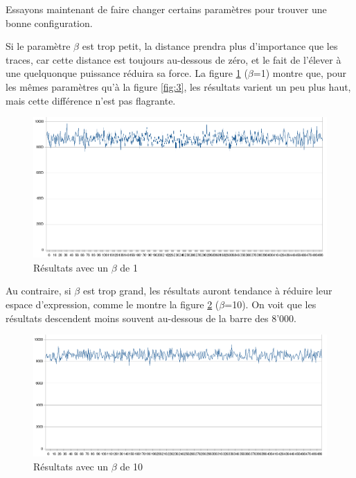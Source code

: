 \documentclass[a4paper, 11pt]{article}
\begin{document}
{	Essayons maintenant de faire changer certains paramètres pour trouver une bonne configuration.

	Si le paramètre $\beta$ est trop petit, la distance prendra plus d'importance que les traces, car cette distance est toujours au-dessous de zéro, et le fait de l'élever à une quelquonque puissance réduira sa force. La figure \ref{fig:5} ($\beta$=1) montre que, pour les mêmes paramètres qu'à la figure \ref{fig:3}, les résultats varient un peu plus haut, mais cette différence n'est pas flagrante.

\begin{figure}[H]
   \begin{center}
      \includegraphics[width=14cm]{../images/5.png}
   \end{center}
   \caption{Résultats avec un $\beta$ de 1}
	\label{fig:5}
\end{figure}

	Au contraire, si $\beta$ est trop grand, les résultats auront tendance à réduire leur espace d'expression, comme le montre la figure \ref{fig:6} ($\beta$=10). On voit que les résultats descendent moins souvent au-dessous de la barre des 8'000.

\begin{figure}[H]
   \begin{center}
      \includegraphics[width=14cm]{../images/6.png}
   \end{center}
   \caption{Résultats avec un $\beta$ de 10}
	\label{fig:6}
\end{figure}

}
\end{document}
